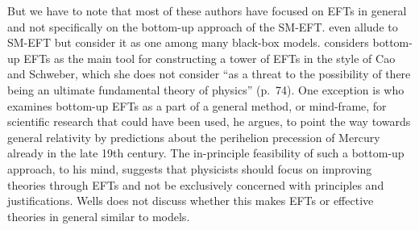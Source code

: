 But we have to note that most of these authors have focused on EFTs in general and not specifically on the bottom-up approach of the SM-EFT.
\citet[p.~3]{Rivat2020-RIVPFO} even allude to SM-EFT but consider it as one among many black-box models. 
\citet[p.~72]{Crowther2016-CROESU} considers bottom-up EFTs as the main tool for constructing a tower of EFTs in the style of Cao and Schweber, which she does not consider ``as a threat to the possibility of there being an ultimate fundamental theory of physics'' (p.~74).  
One exception is \citet{wells2011} who examines bottom-up EFTs as a part of a general method, or mind-frame, for scientific research that could have been used, he argues, to point the way towards general relativity by predictions about the perihelion precession of Mercury already in the late 19th century. 
The in-principle feasibility of such a bottom-up approach, to his mind, suggests that physicists should focus on improving theories through EFTs and not be exclusively concerned with principles and justifications.
Wells does not discuss whether this makes EFTs or effective theories in general similar to models.

